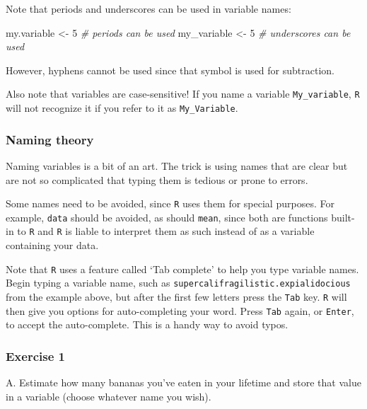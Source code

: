 \documentclass[
]{book}
\newenvironment{Shaded}{\begin{snugshade}}{\end{snugshade}}
\newcommand{\CommentTok}[1]{\textcolor[rgb]{0.56,0.35,0.01}{\textit{#1}}}
\newcommand{\DecValTok}[1]{\textcolor[rgb]{0.00,0.00,0.81}{#1}}
\newcommand{\NormalTok}[1]{#1}
\newcommand{\StringTok}[1]{\textcolor[rgb]{0.31,0.60,0.02}{#1}}
\begin{document}
Note that periods and underscores can be used in variable names:

\begin{Shaded}
\begin{Highlighting}[]
\NormalTok{my.variable <-}\StringTok{ }\DecValTok{5} \CommentTok{# periods can be used}
\NormalTok{my_variable <-}\StringTok{ }\DecValTok{5} \CommentTok{# underscores can be used}
\end{Highlighting}
\end{Shaded}

However, hyphens cannot be used since that symbol is used for subtraction.

Also note that variables are case-sensitive! If you name a variable \texttt{My\_variable}, \texttt{R} will not recognize it if you refer to it as \texttt{My\_Variable}.

\hypertarget{naming-theory}{%
\subsubsection*{Naming theory}\label{naming-theory}}

Naming variables is a bit of an art. The trick is using names that are clear but are not so complicated that typing them is tedious or prone to errors.

Some names need to be avoided, since \texttt{R} uses them for special purposes. For example, \texttt{data} should be avoided, as should \texttt{mean}, since both are functions built-in to \texttt{R} and \texttt{R} is liable to interpret them as such instead of as a variable containing your data.

Note that \texttt{R} uses a feature called `Tab complete' to help you type variable names. Begin typing a variable name, such as \texttt{supercalifragilistic.expialidocious} from the example above, but after the first few letters press the \texttt{Tab} key. \texttt{R} will then give you options for auto-completing your word. Press \texttt{Tab} again, or \texttt{Enter}, to accept the auto-complete. This is a handy way to avoid typos.

\hypertarget{exercise-1-2}{%
\subsubsection*{Exercise 1}\label{exercise-1-2}}

A. Estimate how many bananas you've eaten in your lifetime and store that value in a variable (choose whatever name you wish).
\end{document}

